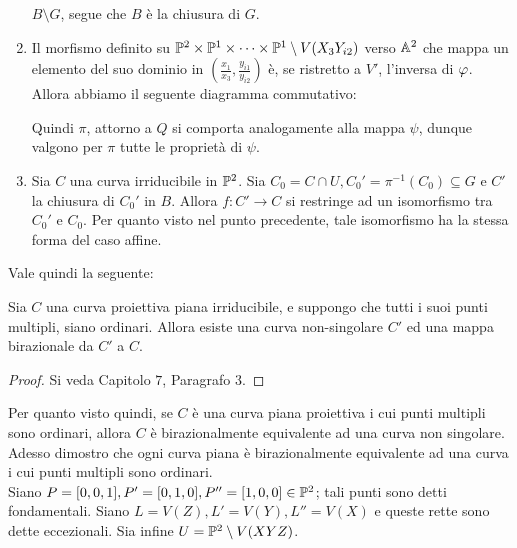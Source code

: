 \begin{enumerate}
        $B \setminus G$, segue che $B$ è la chiusura di $G$.
        \item Il morfismo definito su $\P^2 \times \P^1 \times \cdots \times \P^1 \setminus V(X_3Y_{i2})$ verso $\A^2$ che mappa un elemento del suo dominio in $(\frac{x_1}{x_3},\frac{y_{i1}}{y_{i2}})$ è, se ristretto a $V'$, l'inversa di $\gvf$. Allora abbiamo il seguente diagramma 
        commutativo: \\
        \begin{center}
        \end{center}
        Quindi $\pi$, attorno a $Q$ si comporta analogamente alla mappa $\psi$, dunque valgono per $\pi$ tutte le proprietà di $\psi$.
        \item Sia $C$ una curva irriducibile in $\P^2$. Sia $C_0 = C \cap U, C_0' = \pi^{-1}(C_0) \subseteq G$ e $C'$ la chiusura di $C_0'$ in $B$. Allora $f : C' \to C$ si restringe ad un isomorfismo tra $C_0'$ e $C_0$. Per quanto visto nel punto precedente, tale isomorfismo ha la stessa 
        forma del caso affine.  
    \end{enumerate}
    Vale quindi la seguente: \begin{proposizione}
        Sia $C$ una curva proiettiva piana irriducibile, e suppongo che tutti i suoi punti multipli, siano ordinari. Allora esiste una curva non-singolare $C'$ ed una mappa birazionale da $C'$ a $C$.
    \end{proposizione}
    \begin{proof}
        Si veda \cite{fulton} Capitolo $7$, Paragrafo $3$.
    \end{proof}
    Per quanto visto quindi, se $C$ è una curva piana proiettiva i cui punti multipli sono ordinari, allora $C$ è birazionalmente equivalente ad una curva non singolare. Adesso dimostro che ogni curva piana è birazionalmente equivalente ad una curva i cui punti multipli sono ordinari.\\
    Siano $P = [0,0,1], P' = [0,1,0], P'' = [1,0,0] \in \P^2$; tali punti sono detti fondamentali. Siano $L = V(Z), L' = V(Y), L'' = V(X)$ e queste rette sono dette eccezionali. Sia infine $U = \P^2 \setminus V(XYZ)$.\\
